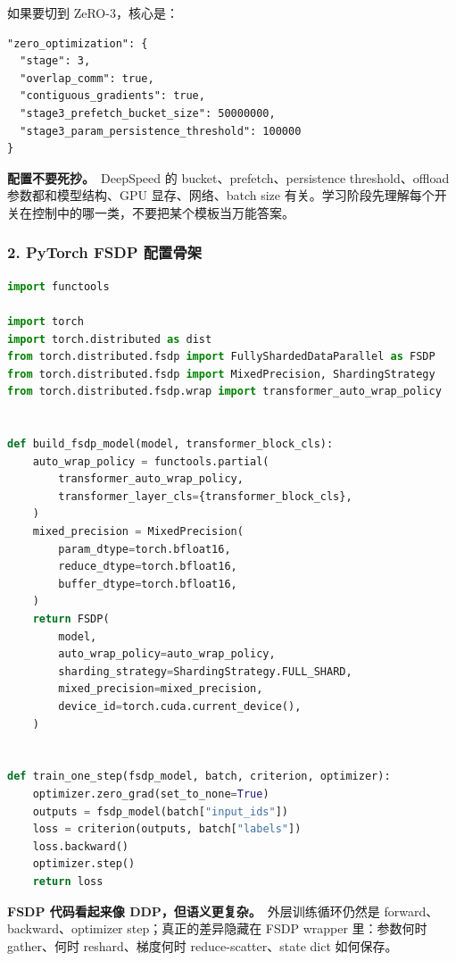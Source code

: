 如果要切到 ZeRO-3，核心是：

\begin{lstlisting}[language={}]
"zero_optimization": {
  "stage": 3,
  "overlap_comm": true,
  "contiguous_gradients": true,
  "stage3_prefetch_bucket_size": 50000000,
  "stage3_param_persistence_threshold": 100000
}
\end{lstlisting}

\begin{warnbox}
\textbf{配置不要死抄。}\
DeepSpeed 的 bucket、prefetch、persistence threshold、offload 参数都和模型结构、GPU 显存、网络、batch size 有关。学习阶段先理解每个开关在控制中的哪一类，不要把某个模板当万能答案。
\end{warnbox}

\subsubsection*{2. PyTorch FSDP 配置骨架}

\begin{lstlisting}[language=Python, caption=PyTorch FSDP 最小训练骨架]
import functools

import torch
import torch.distributed as dist
from torch.distributed.fsdp import FullyShardedDataParallel as FSDP
from torch.distributed.fsdp import MixedPrecision, ShardingStrategy
from torch.distributed.fsdp.wrap import transformer_auto_wrap_policy


def build_fsdp_model(model, transformer_block_cls):
    auto_wrap_policy = functools.partial(
        transformer_auto_wrap_policy,
        transformer_layer_cls={transformer_block_cls},
    )
    mixed_precision = MixedPrecision(
        param_dtype=torch.bfloat16,
        reduce_dtype=torch.bfloat16,
        buffer_dtype=torch.bfloat16,
    )
    return FSDP(
        model,
        auto_wrap_policy=auto_wrap_policy,
        sharding_strategy=ShardingStrategy.FULL_SHARD,
        mixed_precision=mixed_precision,
        device_id=torch.cuda.current_device(),
    )


def train_one_step(fsdp_model, batch, criterion, optimizer):
    optimizer.zero_grad(set_to_none=True)
    outputs = fsdp_model(batch["input_ids"])
    loss = criterion(outputs, batch["labels"])
    loss.backward()
    optimizer.step()
    return loss
\end{lstlisting}

\begin{intubox}
\textbf{FSDP 代码看起来像 DDP，但语义更复杂。}\
外层训练循环仍然是 forward、backward、optimizer step；真正的差异隐藏在 FSDP wrapper 里：参数何时 gather、何时 reshard、梯度何时 reduce-scatter、state dict 如何保存。
\end{intubox}


